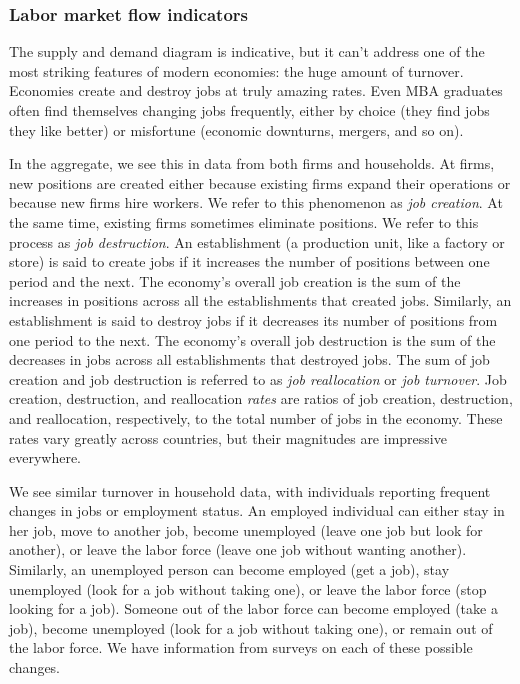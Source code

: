 \documentclass[letterpaper,12pt]{article}
\begin{document}
\subsubsection*{Labor market flow indicators}

The supply and demand diagram is indicative,
but it can't address one of the most striking features of
modern economies:
the huge amount of turnover.
Economies create and destroy jobs at truly amazing rates.
Even MBA graduates often find themselves changing jobs
frequently, either by choice (they find jobs they like better)
or misfortune (economic downturns, mergers, and so on).


In the aggregate,
we see this in data from both firms and households.
At firms, new positions are created either because existing firms
expand their operations or because new firms hire workers. We
refer to this phenomenon as \textit{job creation}. At the same
time, existing firms sometimes eliminate positions.  We refer to
this process as \textit{job destruction}.  An establishment (a
production unit, like a factory or store) is said to create
jobs if it increases the number of positions between one period
and the next.  The economy's overall job creation is the sum of
the increases in positions across all the establishments that
created jobs.  Similarly, an establishment is said to destroy jobs
if it decreases its number of positions from one period to the
next. The economy's overall job destruction is the sum of the
decreases in jobs across all establishments that destroyed jobs.
The sum of job creation and job destruction is referred to as
\textit{job reallocation} or \textit{job turnover}. Job creation,
destruction, and reallocation \textit{rates} are ratios of
job creation, destruction, and reallocation, respectively, to the
total number of jobs in the economy. These rates vary greatly
across countries, but their magnitudes are impressive everywhere.

We see similar turnover in household data,
with individuals reporting frequent changes in jobs
or employment status.
An employed individual can either stay in her job, move to another
job, become unemployed (leave one job but look for another), or
leave the labor force (leave one job without wanting another).
Similarly, an unemployed person can become employed (get a job),
stay unemployed (look for a job without taking one), or leave the
labor force (stop looking for a job).  Someone out of the labor
force can become employed (take a job), become unemployed (look
for a job without taking one), or remain out of the labor force.
We have information from surveys on each of these possible
changes.
\end{document}
